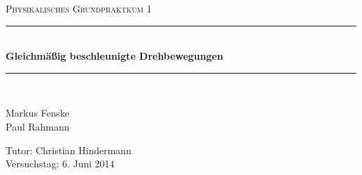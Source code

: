 \newcommand{\HRule}{\rule{\linewidth}{0.5mm}}

\begin{center}
  \textsc{\Large Physikalisches Grundpraktkum 1}
  \HRule\\[0.4 cm]
  {\huge \bfseries Gleichmäßig beschleunigte Drehbewegungen}
  \HRule\\[0.4 cm]

  \begin{minipage}{0.45\textwidth}
  \begin{flushleft}
    Markus Fenske \\
    Paul Rahmann
  \end{flushleft}
  \end{minipage}
  \hfill
  \begin{minipage}{0.45\textwidth}
  \begin{flushright}
    Tutor: Christian Hindermann \\
    Versuchstag: 6. Juni 2014
  \end{flushright}
  \end{minipage}

  \vfill


\end{center}
\newpage
